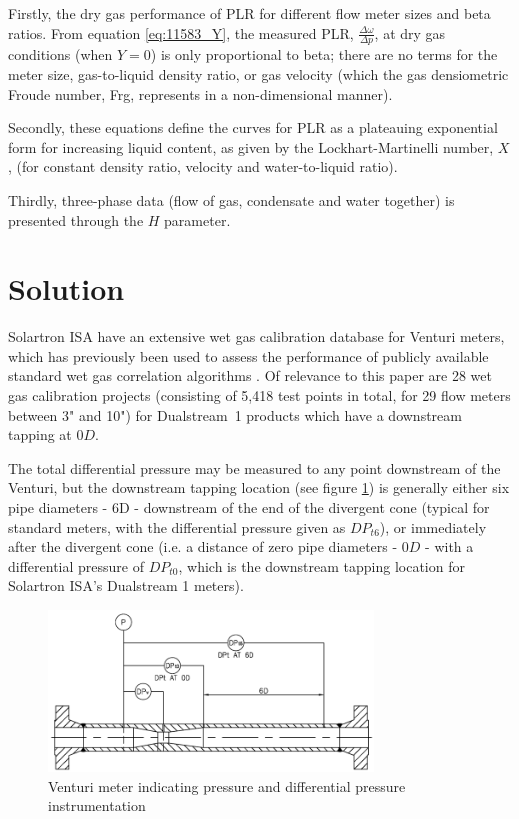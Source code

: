 \documentclass[journal]{IEEEtran}
\begin{document}
Firstly, the dry gas performance of \acrshort{PLR} for different flow meter sizes and beta ratios. From equation \ref{eq:11583_Y}, the measured \acrshort{PLR}, $\frac{\Delta \omega}{\Delta p}$, at dry gas conditions (when $Y=0$) is only proportional to beta; there are no terms for the meter size, gas-to-liquid density ratio, or gas velocity (which the gas densiometric Froude number, \acrshort{Frg}, represents in a non-dimensional manner).

Secondly, these equations define the curves for \acrshort{PLR} as a plateauing exponential form for increasing liquid content, as given by the Lockhart-Martinelli number, $X$, (for constant density ratio, velocity and water-to-liquid ratio).
  
Thirdly, three-phase data (flow of gas, condensate and water together) is presented through the $H$ parameter. 


\section{Solution}

Solartron ISA have an extensive wet gas calibration database for Venturi meters, which has previously been used to assess the performance of publicly available standard wet gas correlation algorithms \cite{Collins2015}.  Of relevance to this paper are 28 wet gas calibration projects (consisting of 5,418 test points in total, for 29 flow meters between 3" and 10") for Dualstream~1 products which have a downstream tapping at $0D$.

The total differential pressure may be measured to any point downstream of the Venturi, but the downstream tapping location (see figure \ref{fig:Venturi}) is generally either six pipe diameters - $6$\acrshort{D} - downstream of the end of the divergent cone (typical for standard meters, with the differential pressure given as $DP_{t6}$), or immediately after the divergent cone (i.e. a distance of zero pipe diameters - $0D$ - with a differential pressure of $DP_{t0}$, which is the downstream tapping location for Solartron ISA's Dualstream 1 meters).

\begin{figure}[ht]
\centering
\includegraphics[width=3.4in]{Venturi.png}
\caption[]{ Venturi meter indicating pressure and differential pressure\\instrumentation }
\label{fig:Venturi}
\end{figure}
\end{document}
